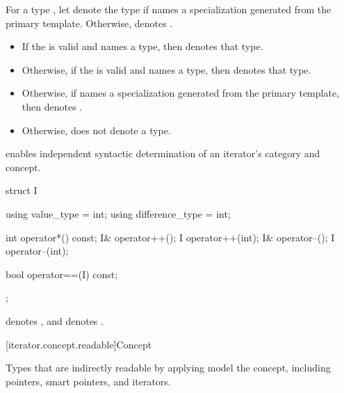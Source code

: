 \pnum
For a type , let  denote
the type  if  names
a specialization generated from the primary template.
Otherwise,  denotes
.
\begin{itemize}
\item If the 
   is valid
  and names a type, then  denotes that
  type.
\item Otherwise, if the 
  is valid and names a type, then 
  denotes that type.
\item Otherwise, if  names a specialization generated
  from the primary template, then 
  denotes .
\item Otherwise,  does not denote a type.
\end{itemize}

\pnum
\begin{note}
 enables independent syntactic determination
of an iterator's category and concept.
\end{note}
\begin{example}
\begin{codeblock}
struct I {
  using value_type = int;
  using difference_type = int;

  int operator*() const;
  I& operator++();
  I operator++(int);
  I& operator--();
  I operator--(int);

  bool operator==(I) const;
};
\end{codeblock}
 denotes ,
and  denotes .
\end{example}

[iterator.concept.readable]{Concept }

\pnum
Types that are indirectly readable by applying 
model the  concept, including
pointers, smart pointers, and iterators.

